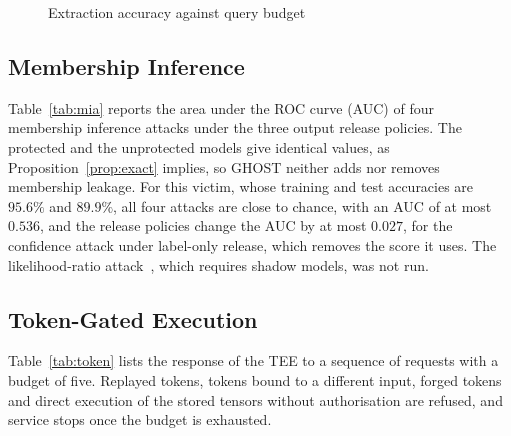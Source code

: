 \documentclass[lettersize,journal]{IEEEtran}
\begin{document}
\begin{figure}[!t]
\centering

\caption{Extraction accuracy against query budget}
\label{fig:extract}
\end{figure}

\subsection{Membership Inference}
Table~\ref{tab:mia} reports the area under the ROC curve (AUC) of four membership inference attacks under the three output release policies. The protected and the unprotected models give identical values, as Proposition~\ref{prop:exact} implies, so GHOST neither adds nor removes membership leakage. For this victim, whose training and test accuracies are $95.6\%$ and $89.9\%$, all four attacks are close to chance, with an AUC of at most $0.536$, and the release policies change the AUC by at most $0.027$, for the confidence attack under label-only release, which removes the score it uses. The likelihood-ratio attack~\cite{carlini2022lira}, which requires shadow models, was not run.

\begin{table}[!t]
\centering
\caption{Membership inference AUC (ResNet-20)}
\label{tab:mia}

\end{table}

\subsection{Token-Gated Execution}
Table~\ref{tab:token} lists the response of the TEE to a sequence of requests with a budget of five. Replayed tokens, tokens bound to a different input, forged tokens and direct execution of the stored tensors without authorisation are refused, and service stops once the budget is exhausted.

\begin{table}[!t]
\centering
\caption{Responses of the token gate (budget $Q_{\max}=5$)}
\label{tab:token}

\end{table}
\end{document}
